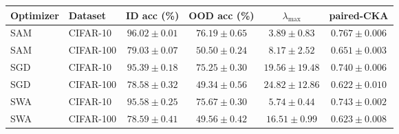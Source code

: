\begin{tabular}{ll|cccc}
\toprule
Optimizer & Dataset & ID acc (\%) & OOD acc (\%) & $\lambda_{\max}$ & paired-CKA \\
\midrule
SAM & CIFAR-10 & $96.02 \pm 0.01$ & $76.19 \pm 0.65$ & $3.89 \pm 0.83$ & $0.767 \pm 0.006$ \\
SAM & CIFAR-100 & $79.03 \pm 0.07$ & $50.50 \pm 0.24$ & $8.17 \pm 2.52$ & $0.651 \pm 0.003$ \\
SGD & CIFAR-10 & $95.39 \pm 0.18$ & $75.25 \pm 0.30$ & $19.56 \pm 19.48$ & $0.740 \pm 0.006$ \\
SGD & CIFAR-100 & $78.58 \pm 0.32$ & $49.34 \pm 0.56$ & $24.82 \pm 12.86$ & $0.622 \pm 0.010$ \\
SWA & CIFAR-10 & $95.58 \pm 0.25$ & $75.67 \pm 0.30$ & $5.74 \pm 0.44$ & $0.743 \pm 0.002$ \\
SWA & CIFAR-100 & $78.59 \pm 0.41$ & $49.56 \pm 0.42$ & $16.51 \pm 0.99$ & $0.623 \pm 0.008$ \\
\bottomrule
\end{tabular}
